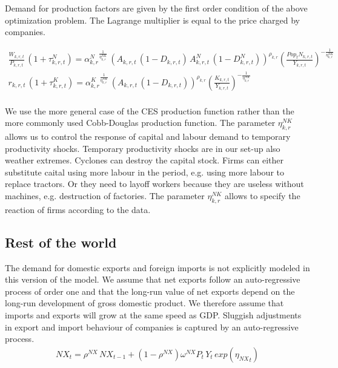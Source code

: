 \documentclass[10pt,a4paper]{article}
\begin{document}
Demand for production factors are given by the first order condition of the above optimization problem. The Lagrange multiplier is equal to the price charged by companies. 

\begin{align}\label{eq:focfirm}
\frac{W_{k,r,t}}{P_{k,r,t}}  \, (1 + \tau^{N}_{k,r,t}) = {\alpha^{N}_{k,r}}^{\frac{1}{\eta^{NK}_{k,r}}} \, \left(A_{k,r,t} \, (1 - D_{k,r,t}) \, A^N_{k,r,t} \, (1 - D^N_{k,r,t})\right)^{\rho_{k,r}} \left(\frac{Pop_{t} N_{k,r,t}}{Y_{k,r,t}}\right)^{-\frac{1}{\eta^{NK}_{k,r}}} \nonumber \\ 
r_{k,r,t} \, (1 + \tau^{K}_{k,r,t}) = {\alpha^{K}_{k,r}}^{\frac{1}{\eta^{NK}_{k,r}}} \, \left(A_{k,r,t} \, (1 - D_{k,r,t})\right)^{\rho_{k,r}}\left(\frac{K_{k,r,t}}{Y_{k,r,t}} \right)^{-\frac{1}{\eta^{NK}_{k,r}}} \\ 
\end{align}

We use the more general case of the CES production function rather than the more commonly used Cobb-Douglas production function. The parameter $\eta^{NK}_{k,r}$ allows us to control the response of capital and labour demand to temporary productivity shocks. Temporary productivity shocks are in our set-up also weather extremes. Cyclones can destroy the capital stock. Firms can either substitute caital using more labour in the period, e.g. using more labour to replace tractors. Or they need to layoff workers because they are useless without machines, e.g. destruction of factories. The parameter $\eta^{NK}_{k,r}$ allows to specify the reaction of firms according to the data.

\subsection{Rest of the world}

The demand for domestic exports and foreign imports is not explicitly modeled in this version of the model. We assume that net exports follow an auto-regressive process of order one and that the long-run value of net exports depend on the long-run development of gross domestic product. We therefore assume that imports and exports will grow at the same speed as GDP. Sluggish adjustments in export and import behaviour of companies is captured by an auto-regressive process. 
\begin{align}
NX_{t} = \rho^{NX} \, NX_{t-1} + (1 - \rho^{NX}) \omega^{NX} P_{t} \, Y_{t} \, exp\left({{\eta_{NX}}_{t}}\right)
\end{align}
\end{document}
